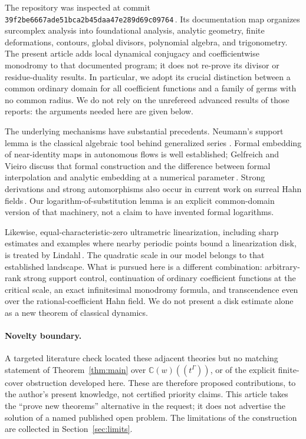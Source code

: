 \documentclass[11pt,a4paper]{article}
\numberwithin{equation}{section}
\theoremstyle{definition}
\theoremstyle{remark}
\newcommand{\C}{\mathbb C}
\newcommand{\commit}{\texttt{39f2be6667ade51bca2b45daa47e289d69c09764}}
\begin{document}
The repository was inspected at commit \commit\,\cite{Repo}.  Its documentation
map organizes surcomplex analysis into foundational analysis, analytic
geometry, finite deformations, contours, global divisors, polynomial algebra,
and trigonometry.  The present article adds local dynamical conjugacy and
coefficientwise monodromy to that documented program; it does not re-prove
its divisor or residue-duality results.  In particular, we adopt its crucial
distinction between a common ordinary domain for all coefficient functions
and a family of germs with no common radius.  We do not rely on the
unrefereed advanced results of those reports: the arguments needed here are
given below.

The underlying mechanisms have substantial precedents.  Neumann's support
lemma is the classical algebraic tool behind generalized series
\cite{Neumann}.  Formal embedding of near-identity maps in autonomous flows
is well established; Gelfreich and Vieiro discuss that formal construction
and the difference between formal interpolation and analytic embedding at a
numerical parameter\,\cite{GV}.  Strong derivations and strong automorphisms
also occur in current work on surreal Hahn fields\,\cite{KKS}.
Our logarithm-of-substitution lemma is an explicit common-domain version of
that machinery, not a claim to have invented formal logarithms.

Likewise, equal-characteristic-zero ultrametric linearization, including
sharp estimates and examples where nearby periodic points bound a
linearization disk, is treated by Lindahl\,\cite{Lindahl}.  The quadratic
scale in our model belongs to that established landscape.  What is pursued
here is a different combination: arbitrary-rank strong support control,
continuation of ordinary coefficient functions at the critical scale, an
exact infinitesimal monodromy formula, and transcendence even over the
rational-coefficient Hahn field.  We do not present a disk estimate alone as
a new theorem of classical dynamics.

\paragraph{Novelty boundary.}
A targeted literature check located these adjacent theories but no matching
statement of Theorem~\ref{thm:main} over $\C(w)((t^\Gamma))$, or of the explicit
finite-cover obstruction developed here.  These are therefore proposed
contributions, to the author's present knowledge, not certified priority
claims.  This article takes the ``prove new theorems'' alternative in the
request; it does not advertise the solution of a named published open
problem.  The limitations of the construction are collected in
Section~\ref{sec:limits}.
\end{document}
